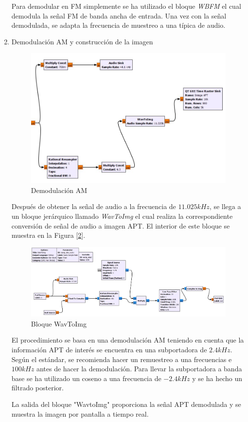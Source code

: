\documentclass[a4paper,openright,12pt]{article}
\begin{document}
\begin{enumerate}
 Para demodular en FM simplemente se ha utilizado el bloque \textit{WBFM} el cual demodula la señal FM de banda ancha de entrada. Una vez con la señal demodulada, se adapta la frecuencia de muestreo a una típica de audio.	
	
	\item Demodulación AM y construcción de la imagen
	
		\begin{figure}[hbtp]
 \centering
 \includegraphics[width = 12cm]{imagenes/apt_blocks.JPG}
 \caption{Demodulación AM}
 \label{apt_blocks}
 \end{figure}
	
	
Después de obtener la señal de audio a la frecuencia de $11.025 kHz$, se llega a un bloque jerárquico llamado \textit{WavToImg} el cual realiza la correspondiente conversión de señal de audio a imagen APT. El interior de este bloque se muestra en la Figura [\ref{wavtoimage}].

 \begin{figure}[H]
 \centering
 \includegraphics[width = 1 \linewidth]{imagenes/APT_hier.JPG}
 \caption{Bloque WavToImg}
 \label{wavtoimage}
 \end{figure}	
 
 El procedimiento se basa en una demodulación AM teniendo en cuenta que la información APT de interés se encuentra en una subportadora de $2.4 kHz$. 
	Según el estándar, se recomienda hacer un remuestreo a una frecuencias e $100 kHz$ antes de hacer la demodulación. Para llevar la subportadora a banda base se ha utilizado un coseno a una frecuencia de $-2.4 kHz$ y se ha hecho un filtrado posterior.
	
La salida del bloque "WavtoImg" proporciona la señal APT demodulada y se muestra la imagen por pantalla a tiempo real.
	
	
	\end{enumerate}
	
\end{document}
